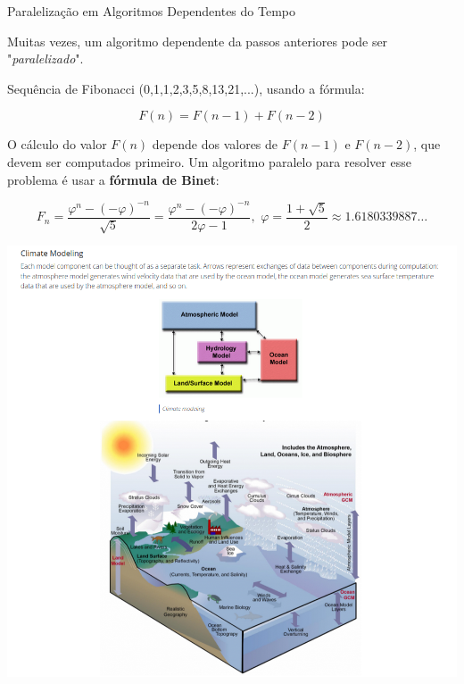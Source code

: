 \documentclass{beamer}
\begin{document}
	\begin{frame}{Paralelização em Algoritmos Dependentes do Tempo}
		
		Muitas vezes, um algoritmo dependente da passos anteriores pode ser "\emph{paralelizado}".
		
		\vspace{0.2cm}
		 Sequência de Fibonacci (0,1,1,2,3,5,8,13,21,...),  usando a fórmula:
		
		\[
		F(n) = F(n-1) + F(n-2)
		\]
		
		O cálculo do valor \(F(n)\) depende dos valores de \(F(n-1)\) e \(F(n-2)\), que devem ser computados primeiro. Um algoritmo paralelo para resolver esse problema é usar a \textbf{fórmula de Binet}:
		
		\[
		F_n = \frac{\varphi^n - (-\varphi)^{-n}}{\sqrt{5}} = \frac{\varphi^n - (-\varphi)^{-n}}{2\varphi - 1},\,\,
		\varphi = \frac{1 + \sqrt{5}}{2} \approx 1.61803 39887\ldots
		\]
		
	\end{frame}
	
\begin{frame}
\centering
			\includegraphics[scale=0.3]{climate_modelling.png}

\end{frame}
	
\end{document}
